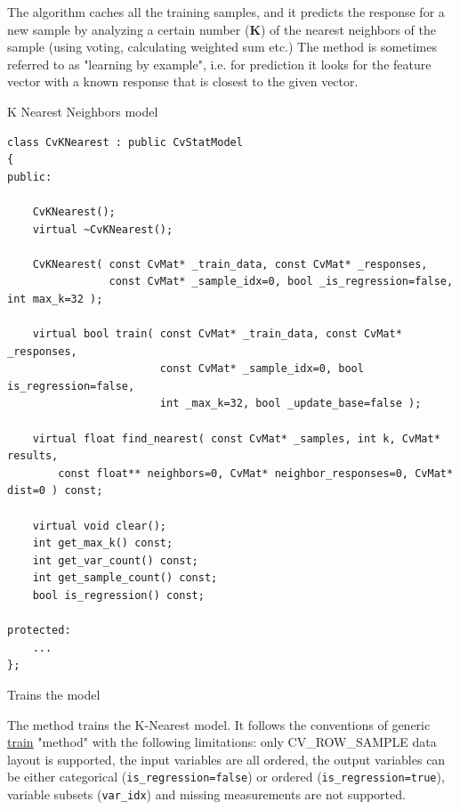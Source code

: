 The algorithm caches all the training samples, and it predicts the response for a new sample by analyzing a certain number (\textbf{K}) of the nearest neighbors of the sample (using voting, calculating weighted sum etc.) The method is sometimes referred to as "learning by example", i.e. for prediction it looks for the feature vector with a known response that is closest to the given vector.



K Nearest Neighbors model

\begin{lstlisting}
class CvKNearest : public CvStatModel
{
public:

    CvKNearest();
    virtual ~CvKNearest();

    CvKNearest( const CvMat* _train_data, const CvMat* _responses,
                const CvMat* _sample_idx=0, bool _is_regression=false, int max_k=32 );

    virtual bool train( const CvMat* _train_data, const CvMat* _responses,
                        const CvMat* _sample_idx=0, bool is_regression=false,
                        int _max_k=32, bool _update_base=false );

    virtual float find_nearest( const CvMat* _samples, int k, CvMat* results,
        const float** neighbors=0, CvMat* neighbor_responses=0, CvMat* dist=0 ) const;

    virtual void clear();
    int get_max_k() const;
    int get_var_count() const;
    int get_sample_count() const;
    bool is_regression() const;

protected:
    ...
};
\end{lstlisting}




Trains the model


The method trains the K-Nearest model. It follows the conventions of generic \href{#CvStatModel_train}{train} "method" with the following limitations: only CV\_ROW\_SAMPLE data layout is supported, the input variables are all ordered, the output variables can be either categorical (\texttt{is\_regression=false}) or ordered (\texttt{is\_regression=true}), variable subsets (\texttt{var\_idx}) and missing measurements are not supported.

